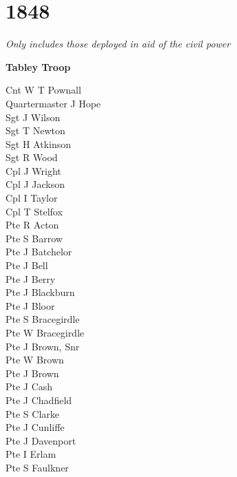 \chapter*{1848}

\vspace*{10mm}

\begin{center}
  \textit{Only includes those deployed in aid of the civil power}
\end{center}

\vspace*{10mm}

\begin{center}
  \Large
  \textbf{Tabley Troop}
\end{center}

\begin{multicols}{3}
  \small
  \noindent
  Cnt W T Pownall \\
  Quartermaster J Hope \\
  Sgt J Wilson \\
  Sgt T Newton \\
  Sgt H Atkinson \\
  Sgt R Wood \\
  Cpl J Wright \\
  Cpl J Jackson \\
  Cpl I Taylor \\
  Cpl T Stelfox \\
  Pte R Acton \\
  Pte S Barrow \\
  Pte J Batchelor \\
  Pte J Bell \\
  Pte J Berry \\
  Pte J Blackburn \\
  Pte J Bloor \\
  Pte S Bracegirdle \\
  Pte W Bracegirdle \\
  Pte J Brown, Snr \\
  Pte W Brown \\
  Pte J Brown \\
  Pte J Cash \\
  Pte J Chadfield \\
  Pte S Clarke \\
  Pte J Cunliffe \\
  Pte J Davenport \\
  Pte I Erlam \\
  Pte S Faulkner \\

\end{multicols}
